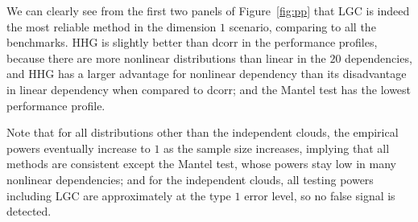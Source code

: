 \documentclass[11pt]{article}
\begin{document}
We can clearly see from the first two panels of Figure~\ref{fig:pp} that LGC is indeed the most reliable method in the dimension $1$ scenario, comparing to all the benchmarks. HHG is slightly better than dcorr in the performance profiles, because there are more nonlinear distributions than linear in the $20$ dependencies, and HHG has a larger advantage for nonlinear dependency than its disadvantage in linear dependency when compared to dcorr; and the Mantel test has the lowest performance profile. 

Note that for all distributions other than the independent clouds, the empirical powers eventually increase to $1$ as the sample size increases, implying that all methods are consistent except the Mantel test, whose powers stay low in many nonlinear dependencies; and for the independent clouds, all testing powers including LGC are approximately at the type $1$ error level, so no false signal is detected. %
\end{document}
